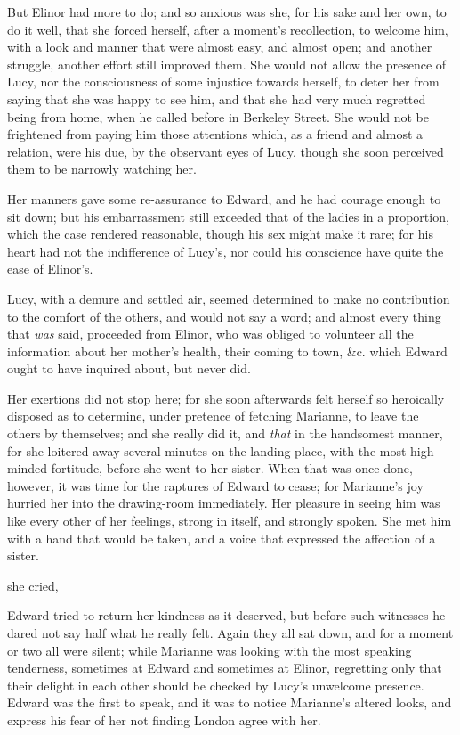 But Elinor had more to do; and so anxious was she, for his sake and her own, to do it well, that she forced herself, after a moment's recollection, to welcome him, with a look and manner that were almost easy, and almost open; and another struggle, another effort still improved them. She would not allow the presence of Lucy, nor the consciousness of some injustice towards herself, to deter her from saying that she was happy to see him, and that she had very much regretted being from home, when he called before in Berkeley Street. She would not be frightened from paying him those attentions which, as a friend and almost a relation, were his due, by the observant eyes of Lucy, though she soon perceived them to be narrowly watching her.

Her manners gave some re-assurance to Edward, and he had courage enough to sit down; but his embarrassment still exceeded that of the ladies in a proportion, which the case rendered reasonable, though his sex might make it rare; for his heart had not the indifference of Lucy's, nor could his conscience have quite the ease of Elinor's.

Lucy, with a demure and settled air, seemed determined to make no contribution to the comfort of the others, and would not say a word; and almost every thing that {\em was} said, proceeded from Elinor, who was obliged to volunteer all the information about her mother's health, their coming to town, &c. which Edward ought to have inquired about, but never did.

Her exertions did not stop here; for she soon afterwards felt herself so heroically disposed as to determine, under pretence of fetching Marianne, to leave the others by themselves; and she really did it, and {\em that} in the handsomest manner, for she loitered away several minutes on the landing-place, with the most high-minded fortitude, before she went to her sister. When that was once done, however, it was time for the raptures of Edward to cease; for Marianne's joy hurried her into the drawing-room immediately. Her pleasure in seeing him was like every other of her feelings, strong in itself, and strongly spoken. She met him with a hand that would be taken, and a voice that expressed the affection of a sister.

 she cried, 

Edward tried to return her kindness as it deserved, but before such witnesses he dared not say half what he really felt. Again they all sat down, and for a moment or two all were silent; while Marianne was looking with the most speaking tenderness, sometimes at Edward and sometimes at Elinor, regretting only that their delight in each other should be checked by Lucy's unwelcome presence. Edward was the first to speak, and it was to notice Marianne's altered looks, and express his fear of her not finding London agree with her.

